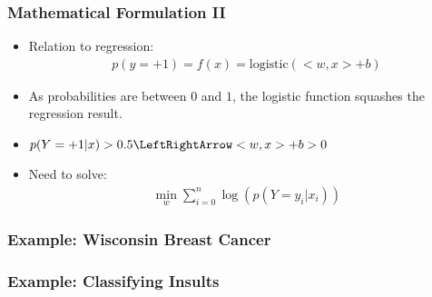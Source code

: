 \begin{frame}
    \frametitle{Mathematical Formulation II}
    \begin{itemize}
        \item Relation to regression:
            \begin{align}
                p(y=+1) = f(x) = \text{logistic}(<w, x> + b)
            \end{align}
        \item As probabilities are between $0$ and $1$, the logistic function
            squashes the regression result.
        \item $p(Y=+1 | x) > 0.5 \LeftRightArrow <w, x> + b > 0$
        \item Need to solve:
            \begin{align}
                \min_w \sum_{i=0}^n \log(p(Y=y_i | x_i))
            \end{align}
    \end{itemize}
\end{frame}

\begin{frame}
    \frametitle{Example: Wisconsin Breast Cancer}
\end{frame}

\begin{frame}
    \frametitle{Example: Classifying Insults}
\end{frame}
